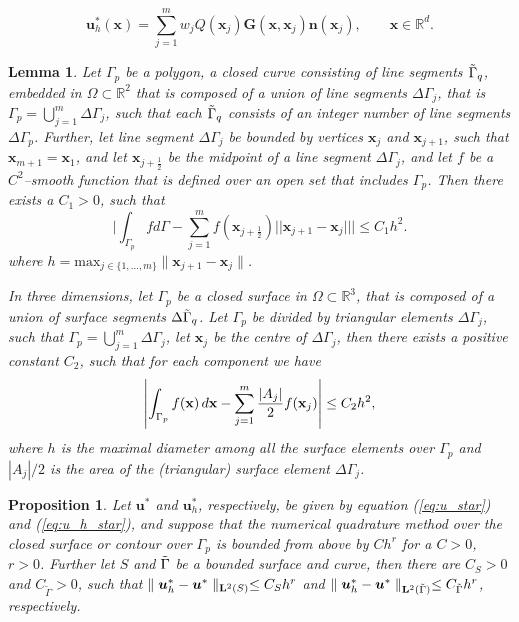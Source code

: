 \documentclass[10pt,a4paper]{amsart}
\newtheorem{lemma}{Lemma}
\newtheorem{proposition}{Proposition}
\begin{document}
\begin{equation}
{\boldsymbol{u}}_{h}^{\ast }({\boldsymbol{x}})=\sum\limits_{j=1}^{m} w_j Q(%
\boldsymbol{x}_{j})\boldsymbol{G}(\boldsymbol{x},\boldsymbol{x}_{j})%
\boldsymbol{n}(\boldsymbol{x}_{j}), \qquad {\boldsymbol x} \in \mathbb{R}^d.  \label{eq:u_h_star}
\end{equation}%

\begin{lemma}\label{lemma:midpoint}
    Let $\Gamma_p$ be a polygon, a closed curve consisting of line segments $\Tilde{\Gamma}_q$, embedded in $\Omega \subset \mathbb{R}^2$ that is composed of 
a union of line segments $\Delta \Gamma_j$, that is ${\Gamma_p = \bigcup_{j=1}^m\Delta \Gamma_j}$, such that each $\Tilde{\Gamma}_q$ consists of an integer number of line segments $\Delta \Gamma_p$. Further, let line segment $\Delta \Gamma_j$ be bounded by vertices $\mathbf{x}_j$ and $\mathbf{x}_{j+1}$, such that 
$\mathbf{x}_{m+1} = \mathbf{x}_{1}$, and let $\mathbf{x}_{j+\frac12}$ be the midpoint of a line segment $\Delta \Gamma_j$, and let $f$ be a $C^2$--smooth function that is defined over an open set 
that includes $\Gamma_p$. Then there exists a $C_1>0$, such that
$$
\bigg| \int_{\Gamma_p} f d \Gamma - \sum_{j = 1}^m f(\mathbf{x}_{j+\frac12}) || \mathbf{x}_{j+1} - \mathbf{x}_j ||  \bigg|\le C_1 h^2.
$$
where $h=\text{max}_{j\in{\{1,...,m}\}}\parallel\mathbf{x}_{j+1} - \mathbf{x}_j\parallel$.

In three dimensions, let $\Gamma_p$ be a closed surface in $\Omega \subset \mathbb{R}^3$, that is composed of a union of surface segments $\Delta \Tilde{\Gamma}_q$. Let $\Gamma_p$ be divided by triangular elements $\Delta \Gamma_j$, such that ${\Gamma_p = \bigcup_{j=1}^m\Delta \Gamma_j}$, let $\mathbf{x}_j$ be the centre of $\Delta \Gamma_j$, then there exists a positive constant $C_2$, such that for each component we have
\[
\left| \int_{\Gamma_p} f({\bf x}) \, d{\bf x} - \sum_{j=1}^{m} \frac{|A_j|}{2} f({\bf x}_j) \right| \leq {C_2}h{^2},
\]
where $h$ is the maximal diameter among all the surface elements over $\Gamma_p$ and $| A_j |/2$ is the area of the (triangular) surface element $\Delta \Gamma_j$.
\end{lemma}

\begin{proposition}
\label{corr2}
    Let $\boldsymbol{u}^{\ast }$ and $\boldsymbol{u}_{h}^{\ast }$, respectively, be given by equation (\ref{eq:u_star}) and (\ref{eq:u_h_star}), and suppose that the numerical quadrature method over the closed surface or contour over $\Gamma_p$ is bounded from above by $C h^r$ for a $C > 0$, $r > 0$. Further let $S$ and $\Tilde{\Gamma}$ be a bounded surface and curve, then there are $C_S > 0$ and $C_{\tilde{\Gamma}}>0$, such that $\parallel \boldsymbol{u}_{h}^*-\boldsymbol{u}^*\parallel_{{\bf L}^2(S)} \leq {C_S}h^{r}$ and $\parallel \boldsymbol{u}_{h}^*-\boldsymbol{u}^*\parallel_{{\bf L}^2(\tilde{\Gamma})} \leq {C_{\tilde{\Gamma}}}h^{r}$, respectively.
\end{proposition} 
\end{document}
